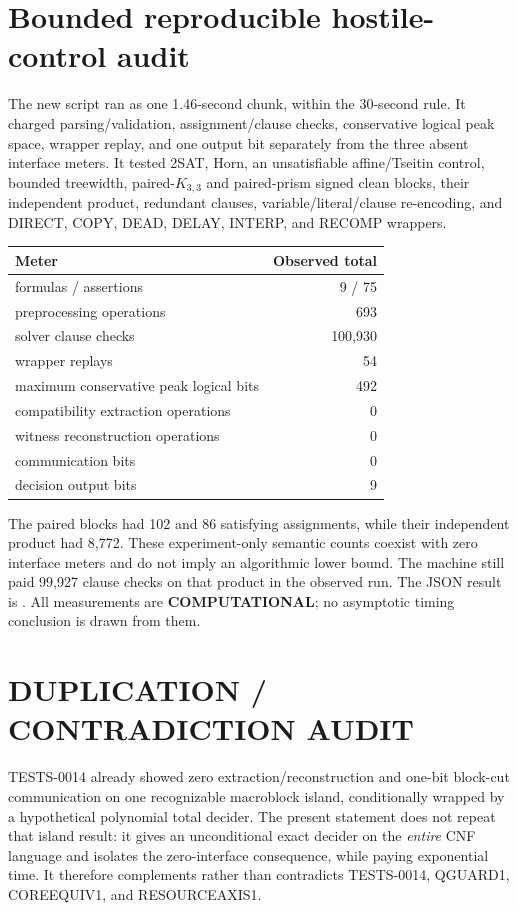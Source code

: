\documentclass[11pt]{article}
\begin{document}
\section{Bounded reproducible hostile-control audit}
The new script
 ran as one
1.46-second chunk, within the 30-second rule.  It charged parsing/validation,
assignment/clause checks, conservative logical peak space, wrapper replay, and
one output bit separately from the three absent interface meters.  It tested
2SAT, Horn, an unsatisfiable affine/Tseitin control, bounded treewidth,
paired-\(K_{3,3}\) and paired-prism signed clean blocks, their independent
product, redundant clauses, variable/literal/clause re-encoding, and DIRECT,
COPY, DEAD, DELAY, INTERP, and RECOMP wrappers.

\begin{center}
\begin{tabular}{lr}
\toprule
Meter & Observed total\\
\midrule
formulas / assertions & 9 / 75\\
preprocessing operations & 693\\
solver clause checks & 100,930\\
wrapper replays & 54\\
maximum conservative peak logical bits & 492\\
compatibility extraction operations & 0\\
witness reconstruction operations & 0\\
communication bits & 0\\
decision output bits & 9\\
\bottomrule
\end{tabular}
\end{center}

The paired blocks had 102 and 86 satisfying assignments, while their
independent product had 8,772.  These experiment-only semantic counts coexist
with zero interface meters and do not imply an algorithmic lower bound.  The
machine still paid 99,927 clause checks on that product in the observed run.
The JSON result is
.
All measurements are \textbf{COMPUTATIONAL}; no asymptotic timing conclusion
is drawn from them.

\section{DUPLICATION / CONTRADICTION AUDIT}
TESTS-0014 already showed zero extraction/reconstruction and one-bit block-cut
communication on one recognizable macroblock island, conditionally wrapped
by a hypothetical polynomial total decider.  The present statement does not
repeat that island result: it gives an unconditional exact decider on the
\emph{entire} CNF language and isolates the zero-interface consequence, while
paying exponential time.  It therefore complements rather than contradicts
TESTS-0014, QGUARD1, COREEQUIV1, and RESOURCEAXIS1.
\end{document}
